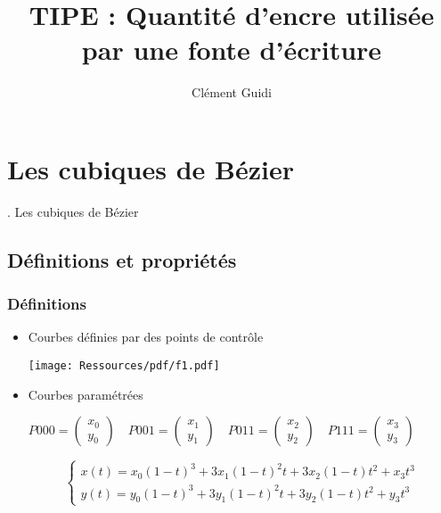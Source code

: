 \documentclass[french]{beamer}
\title{TIPE : Quantité d'encre utilisée par une fonte d'écriture}
\author{Clément Guidi}
\date{}
\begin{document}
\begin{frame}
  \titlepage
\end{frame}

\section{Les cubiques de Bézier}

\begin{frame}
  \center \LARGE \thesection. Les cubiques de Bézier
\end{frame}

\subsection{Définitions et propriétés}

\begin{frame}
  \frametitle{Définitions}
  
  \begin{itemize}
            
  \item
    Courbes définies par des points de contrôle
    
    \begin{center}
      \texttt{[image: Ressources/pdf/f1.pdf]}
    \end{center}

  \item
    Courbes paramétrées

     \medskip
    {\tiny
      $
      P000 = \begin{pmatrix}x_0\\y_0\end{pmatrix} \quad
        P001 = \begin{pmatrix}x_1\\y_1\end{pmatrix} \quad
          P011 = \begin{pmatrix}x_2\\y_2\end{pmatrix} \quad 
            P111 = \begin{pmatrix}x_3\\y_3\end{pmatrix}
              $
    }

    {\scriptsize
    \[
    \begin{cases}
    x(t) = x_0 (1-t)^3 + 3 x_1 (1-t)^2 t + 3 x_2 (1-t) t^2 + x_3 t^3 \\
    y(t) = y_0 (1-t)^3 + 3 y_1 (1-t)^2 t + 3 y_2 (1-t) t^2 + y_3 t^3
    \end{cases}
    \]
    }

  \end{itemize}
  
\end{frame}
\end{document}

